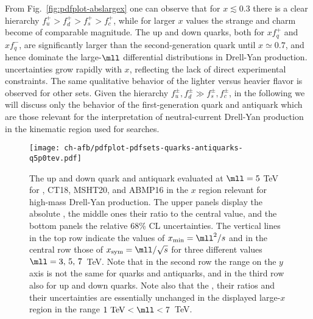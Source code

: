    From Fig.~\ref{fig:pdfplot-abslargex} one can observe that for
   $x\lesssim 0.3$ there is a clear hierarchy
$f_u^+>f_d^+ >f_s^+>f_c^+$, while for larger $x$ values the
   strange and charm \pdfs become of comparable magnitude.
   The up and down quarks, both for $xf^+_q$ and $xf^-_q$, are significantly larger
   than the second-generation quark \pdfs until $x\simeq 0.7$, and hence dominate the
   large-$\mll$ differential distributions in Drell-Yan production.
%
\pdf uncertainties grow rapidly with $x$, reflecting the lack
of direct experimental constraints.
%
The same qualitative behavior of the lighter versus heavier flavor \pdfs
is observed for other \pdf sets.
%
Given the hierarchy $f_u^\pm, f_d^\pm \gg f_s^\pm, f_c^\pm $, in the following
we will discuss only the behavior of the first-generation quark
and antiquark \pdfs which are those relevant for the interpretation
of neutral-current Drell-Yan production in the kinematic region used
for \bsm searches. 
      


\begin{figure}[!t]
 \centering
 \texttt{[image: ch-afb/pdfplot-pdfsets-quarks-antiquarks-q5p0tev.pdf]}
 \caption{\small The up and down quark and antiquark \pdfs evaluated at $\mll=5$ TeV
   for , CT18, MSHT20, and ABMP16 in the $x$ region relevant for
   high-mass Drell-Yan production. The upper panels display the absolute \pdfs,
   the middle ones their ratio to the central  value, and the bottom panels
   the relative 68\% CL uncertainties.
   The vertical lines in the top
   row indicate the values of  $x_{\rm min}=\mll^2/s$ and in the central
   row those of $x_{\rm  sym}=\mll/\sqrt{s}$
   for three
   different values  $\mll=3,\,5,\,7$~TeV.
   Note that in the second row the
   range on the $y$ axis is not the same for quarks and antiquarks,
   and in the third row also for up and down quarks.
   Note also that the
   \pdfs, their ratios and their uncertainties are essentially
   unchanged in the displayed large-$x$ region in the range $1~{\rm TeV}<\mll<7$~TeV.
}    
 \label{fig:mll_dep_pdfs}
\end{figure}

